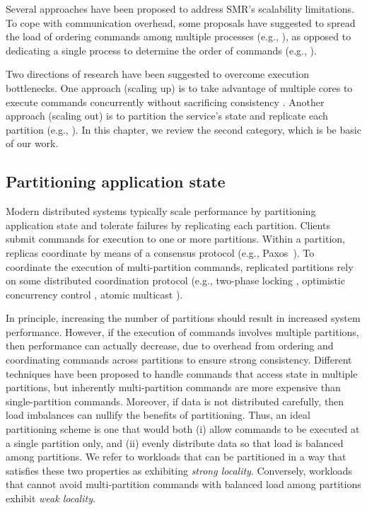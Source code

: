 Several approaches have been proposed to address SMR's scalability limitations.
To cope with communication overhead, some proposals have suggested to spread the
load of ordering commands among multiple processes (e.g.,
\cite{Moraru:2013gw,Mencius,Marandi:2012hb}), as opposed to dedicating a single
process to determine the order of commands (e.g.,
\cite{Lam98}).%

Two directions of research have been suggested to overcome execution
bottlenecks. One approach (scaling up) is to take advantage of multiple cores to
execute commands concurrently without sacrificing consistency
\cite{Kapritsos:2012um,Marandi:2014bj,Kotla:2004ep,Guo:2014jp}. Another approach
(scaling out) is to partition the service's state and replicate each partition
(e.g., \cite{Glendenning:2011kj,Marandi:2011dj}). In this chapter, we review the
second category, which is be basic of our work.

\subsection{Partitioning application state}

Modern distributed systems typically scale performance by partitioning
application state and tolerate failures by replicating each partition. Clients
submit commands for execution to one or more partitions. Within a partition,
replicas coordinate by means of a consensus protocol (e.g., Paxos~\cite{Lam98}).
To coordinate the execution of multi-partition commands, replicated partitions
rely on some distributed coordination protocol (e.g., two-phase locking
\cite{corbett2013spanner}, optimistic concurrency control \cite{Chang:2008},
atomic multicast \cite{bezerra2014ssmr}).

In principle, increasing the number of partitions should result in increased
system performance. However, if the execution of commands involves multiple
partitions, then performance can actually decrease, due to overhead from
ordering and coordinating commands across partitions to ensure strong
consistency. Different techniques have been proposed to handle commands that
access state in multiple partitions, but inherently multi-partition commands are
more expensive than single-partition commands. Moreover, if data is not
distributed carefully, then load imbalances can nullify the benefits of
partitioning. Thus, an ideal partitioning scheme is one that would both (i)
allow commands to be executed at a single partition only, and (ii) evenly
distribute data so that load is balanced among partitions. We refer to workloads
that can be partitioned in a way that satisfies these two properties as
exhibiting \emph{strong locality}. Conversely, workloads that cannot avoid
multi-partition commands with balanced load among partitions exhibit \emph{weak
locality}.

